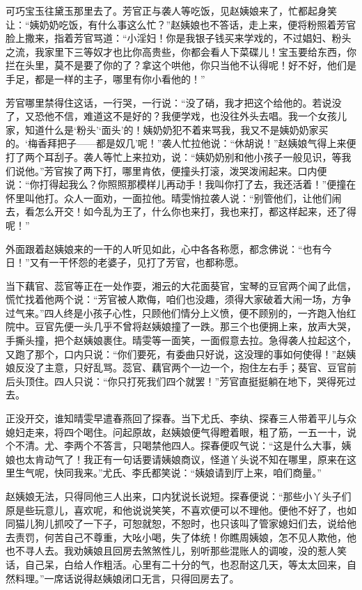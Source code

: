 \documentclass[12pt,oneside]{book}
\begin{document}
可巧宝玉往黛玉那里去了。芳官正与袭人等吃饭，见赵姨娘来了，忙都起身笑让：“姨奶奶吃饭，有什么事这么忙？”赵姨娘也不答话，走上来，便将粉照着芳官脸上撒来，指着芳官骂道：“小淫妇！你是我银子钱买来学戏的，不过娼妇、粉头之流，我家里下三等奴才也比你高贵些，你都会看人下菜碟儿！宝玉要给东西，你拦在头里，莫不是要了你的了？拿这个哄他，你只当他不认得呢！好不好，他们是手足，都是一样的主子，哪里有你小看他的！”

芳官哪里禁得住这话，一行哭，一行说：“没了硝，我才把这个给他的。若说没了，又恐他不信，难道这不是好的？我便学戏，也没往外头去唱。我一个女孩儿家，知道什么是‘粉头’‘面头’的！姨奶奶犯不着来骂我，我又不是姨奶奶家买的。‘梅香拜把子——都是奴几’呢！”袭人忙拉他说：“休胡说！”赵姨娘气得上来便打了两个耳刮子。袭人等忙上来拉劝，说：“姨奶奶别和他小孩子一般见识，等我们说他。”芳官挨了两下打，哪里肯依，便撞头打滚，泼哭泼闹起来。口内便说：“你打得起我么？你照照那模样儿再动手！我叫你打了去，我还活着！”便撞在怀里叫他打。众人一面劝，一面拉他。晴雯悄拉袭人说：“别管他们，让他们闹去，看怎么开交！如今乱为王了，什么你也来打，我也来打，都这样起来，还了得呢！”

外面跟着赵姨娘来的一干的人听见如此，心中各各称愿，都念佛说：“也有今日！”又有一干怀怨的老婆子，见打了芳官，也都称愿。

当下藕官、蕊官等正在一处作耍，湘云的大花面葵官，宝琴的豆官两个闻了此信，慌忙找着他两个说：“芳官被人欺侮，咱们也没趣，须得大家破着大闹一场，方争过气来。”四人终是小孩子心性，只顾他们情分上义愤，便不顾别的，一齐跑入怡红院中。豆官先便一头几乎不曾将赵姨娘撞了一跌。那三个也便拥上来，放声大哭，手撕头撞，把个赵姨娘裹住。晴雯等一面笑，一面假意去拉。急得袭人拉起这个，又跑了那个，口内只说：“你们要死，有委曲只好说，这没理的事如何使得！”赵姨娘反没了主意，只好乱骂。蕊官、藕官两个一边一个，抱住左右手；葵官、豆官前后头顶住。四人只说：“你只打死我们四个就罢！”芳官直挺挺躺在地下，哭得死过去。

正没开交，谁知晴雯早遣春燕回了探春。当下尤氏、李纨、探春三人带着平儿与众媳妇走来，将四个喝住。问起原故，赵姨娘便气得瞪着眼，粗了筋，一五一十，说个不清。尤、李两个不答言，只喝禁他四人。探春便叹气说：“这是什么大事，姨娘也太肯动气了！我正有一句话要请姨娘商议，怪道丫头说不知在哪里，原来在这里生气呢，快同我来。”尤氏、李氏都笑说：“姨娘请到厅上来，咱们商量。”

赵姨娘无法，只得同他三人出来，口内犹说长说短。探春便说：“那些小丫头子们原是些玩意儿，喜欢呢，和他说说笑笑，不喜欢便可以不理他。便他不好了，也如同猫儿狗儿抓咬了一下子，可恕就恕，不恕时，也只该叫了管家媳妇们去，说给他去责罚，何苦自己不尊重，大吆小喝，失了体统！你瞧周姨娘，怎不见人欺他，他也不寻人去。我劝姨娘且回房去煞煞性儿，别听那些混账人的调唆，没的惹人笑话，自己呆，白给人作粗活。心里有二十分的气，也忍耐这几天，等太太回来，自然料理。”一席话说得赵姨娘闭口无言，只得回房去了。
\end{document}
